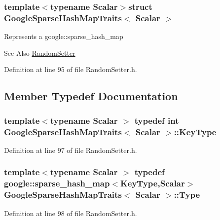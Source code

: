 \subsubsection*{template$<$typename Scalar$>$struct Google\-Sparse\-Hash\-Map\-Traits$<$ Scalar $>$}

Represents a google\-::sparse\-\_\-hash\-\_\-map

\begin{DoxySeeAlso}{See Also}
\hyperlink{class_random_setter}{Random\-Setter} 
\end{DoxySeeAlso}


Definition at line 95 of file Random\-Setter.\-h.



\subsection{Member Typedef Documentation}
\hypertarget{struct_google_sparse_hash_map_traits_aa05d80f01b5646ee1b043e872b2d9526}{
\subsubsection[{Key\-Type}]{\setlength{\rightskip}{0pt plus 5cm}template$<$typename Scalar $>$ typedef {\bf int} {\bf Google\-Sparse\-Hash\-Map\-Traits}$<$ Scalar $>$\-::{\bf Key\-Type}}}\label{struct_google_sparse_hash_map_traits_aa05d80f01b5646ee1b043e872b2d9526}


Definition at line 97 of file Random\-Setter.\-h.

\hypertarget{struct_google_sparse_hash_map_traits_a45276c8bf8dae7a6cb6ad6a0299a6b20}{
\subsubsection[{Type}]{\setlength{\rightskip}{0pt plus 5cm}template$<$typename Scalar $>$ typedef google\-::sparse\-\_\-hash\-\_\-map$<${\bf Key\-Type},Scalar$>$ {\bf Google\-Sparse\-Hash\-Map\-Traits}$<$ Scalar $>$\-::{\bf Type}}}\label{struct_google_sparse_hash_map_traits_a45276c8bf8dae7a6cb6ad6a0299a6b20}


Definition at line 98 of file Random\-Setter.\-h.



